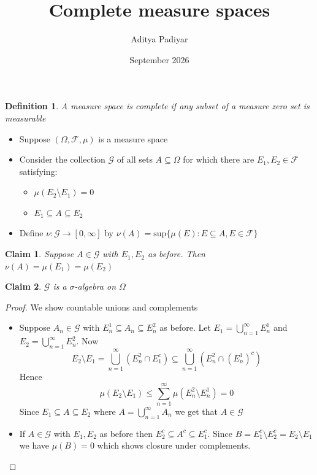 \documentclass[a4paper,11pt]{article}
\title{Complete measure spaces}
\author{Aditya Padiyar}
\date{September 2026}
\newtheorem{definition}{Definition}
\newtheorem{claim}{Claim}
\begin{document}
\maketitle

\begin{definition}
  A measure space is complete if any subset of a measure zero set is measurable
\end{definition}

\begin{itemize}
  \item Suppose $(\Omega,\mathcal{F},\mu)$ is a measure space
  \item Consider the collection $\mathcal{G}$ of all sets $A\subseteq \Omega$ for which there are $E_1,E_2 \in \mathcal{F}$ satisfying:

        \begin{itemize}
          \item $\mu(E_2 \setminus E_1)=0$
          \item $E_1 \subseteq A \subseteq E_2$
        \end{itemize}
        
  \item Define $\nu:\mathcal{G} \to [0,\infty]$ by $\nu(A)=\text{sup}\{\mu(E): E \subseteq A, E \in \mathcal{F} \}$

\end{itemize}

\begin{claim}
  Suppose $A \in \mathcal{G}$ with $E_1,E_2$ as before. Then $\nu(A)=\mu(E_1)=\mu(E_2)$
\end{claim}

\begin{claim}
  $\mathcal{G}$ is a $\sigma$-algebra on $\Omega$
\end{claim}

\begin{proof}
  We show countable unions and complements
  \begin{itemize}
    \item Suppose $A_n \in \mathcal{G}$ with $E_n^1 \subseteq A_n \subseteq E_n^2$ as before. Let $E_1 = \bigcup_{n=1}^\infty E_n^1$ and $E_2=\bigcup_{n=1}^\infty E_n^2$. 
          Now \[E_2 \setminus E_1 = \bigcup_{n=1}^\infty (E_n^2 \cap E_1^c) \subseteq \bigcup_{n=1}^\infty (E_n^2 \cap (E_n^1)^c)\]
          Hence \[\mu(E_2 \setminus E_1) \leq \sum_{n=1}^\infty \mu(E_n^2 \setminus E_n^1)=0\]
          Since $E_1 \subseteq A \subseteq E_2$ where $A=\bigcup_{n=1}^\infty A_n$ we get that $A \in \mathcal{G}$
    \item If $A \in \mathcal{G}$ with $E_1,E_2$ as before then $E_2^c \subseteq A^c \subseteq E_1^c$. 
          Since $B = E_1^c \setminus E_2^c = E_2 \setminus E_1$ we have $\mu(B)=0$ which shows closure under complements.
  \end{itemize}
  
\end{proof}
\end{document}
